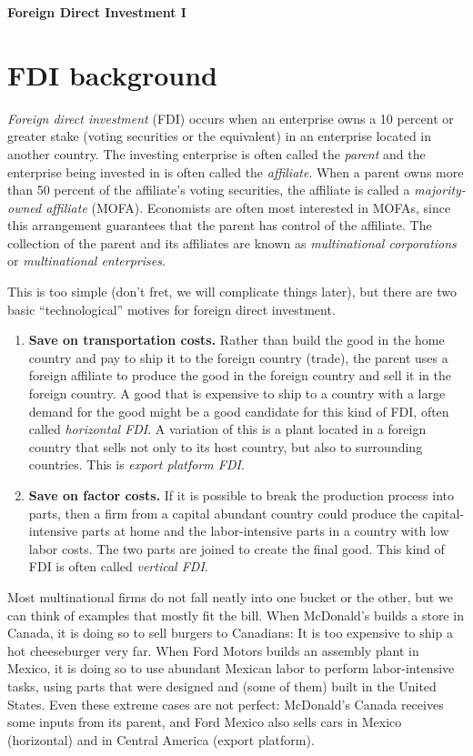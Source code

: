 \documentclass[11pt, pdftex]{article}
\newcommand{\ph}{\phantom}
\begin{document}
\ph{whatever}
\medskip

\centerline{\Large \bf Foreign Direct Investment I}
\section{FDI background}
\textit{Foreign direct investment} (FDI) occurs when an enterprise owns a 10 percent or greater stake (voting securities or the equivalent) in an enterprise located in another country.  The investing enterprise is often called the \textit{parent} and the enterprise being invested in is often called the \textit{affiliate}. When a parent owns more than 50 percent of the affiliate's voting securities, the affiliate is called a \textit{majority-owned affiliate} (MOFA).  Economists are often most interested in MOFAs, since this arrangement guarantees that the parent has control of the affiliate.  The collection of the parent and its affiliates are known as \textit{multinational corporations} or \textit{multinational enterprises}.



This is too simple (don't fret, we will complicate things later), but there are two basic ``technological'' motives for foreign direct investment.
\begin{enumerate}
  \item \textbf{Save on transportation costs.}  Rather than build the good in the home country and pay to ship it to the foreign country (trade), the parent uses a foreign affiliate to produce the good in the foreign country and sell it in the foreign country.  A good that is expensive to ship to a country with a large demand for the good might be a good candidate for this kind of FDI, often called \textit{horizontal FDI}. A variation of this is a plant located in a foreign country that sells not only to its host country, but also to surrounding countries.  This is \textit{export platform FDI}.
  \item \textbf{Save on factor costs.} If it is possible to break the production process into parts, then a firm from a capital abundant country could produce the capital-intensive parts at home and the labor-intensive parts in a country with low labor costs. The two parts are joined to create the final good.  This kind of FDI is often called \textit{vertical FDI}.
\end{enumerate}
Most multinational firms do not fall neatly into one bucket or the other, but we can think of examples that mostly fit the bill. When McDonald's builds a store in Canada, it is doing so to sell burgers to Canadians: It is too expensive to ship a hot cheeseburger very far.  When Ford Motors builds an assembly plant in Mexico, it is doing so to use abundant Mexican labor to perform labor-intensive tasks, using parts that were designed and (some of them) built in the United States. Even these extreme cases are not perfect: McDonald's Canada receives some inputs from its parent, and Ford Mexico also sells cars in Mexico (horizontal) and in Central America (export platform).
\end{document}
